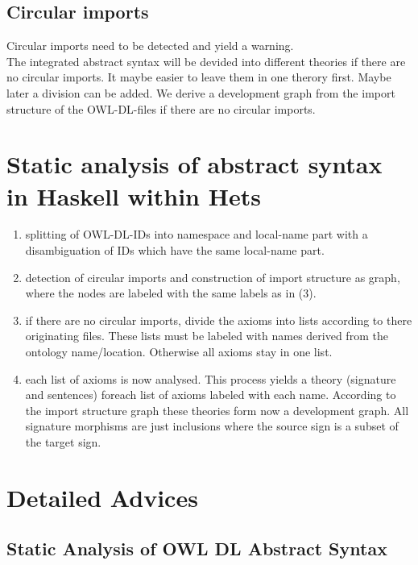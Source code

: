 \documentclass[11pt,a4paper]{article}
\begin{document}
\subsection{Circular imports} 

   Circular imports need to be detected and yield a
   warning.\\
   
The integrated abstract syntax will be devided into different
   theories if there are no circular imports. It maybe easier to leave
   them in one therory first. Maybe later a division can be added.
   We derive a development graph from the import structure of the 
   OWL-DL-files if there are no circular imports.

\section{Static analysis of abstract syntax in Haskell within Hets}
   \begin{enumerate}
   \item splitting of OWL-DL-IDs into namespace and local-name part
       with a disambiguation of IDs which have the same local-name
       part.

   \item detection of circular imports and construction of import
       structure as graph, where the nodes are labeled with the same
       labels as in (3).

   \item if there are no circular imports, divide the axioms into lists
       according to there originating files. These lists must be
       labeled with names derived from the ontology name/location.
       Otherwise all axioms stay in one list.

   \item each list of axioms is now analysed. This process yields a
       theory (signature and sentences) foreach list of axioms labeled
       with each name. According to the import structure graph these
       theories form now a development graph. All signature morphisms
       are just inclusions where the source sign is a subset of the
       target sign.
   \end{enumerate}

\section{Detailed Advices}

\subsection{Static Analysis of OWL DL Abstract Syntax}
\end{document}
